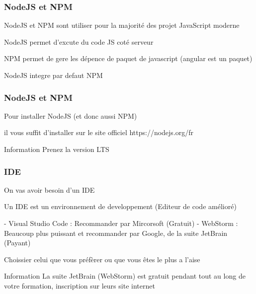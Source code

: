 \documentclass[10pt]{beamer}
\begin{document}
	\begin{frame}
		\frametitle{NodeJS et NPM}

		NodeJS et NPM sont utiliser pour la majorité des projet JavaScript moderne \newline \newline

		NodeJS permet d’excute du code JS coté serveur \newline \newline

		NPM permet de gere les dépence de paquet de javascript (angular est un paquet) \newline \newline

		NodeJS integre par defaut NPM

	\end{frame}

	\begin{frame}
		\frametitle{NodeJS et NPM}

		Pour installer NodeJS (et donc aussi NPM) \newline \newline

		il vous suffit d'installer sur le site officiel https://nodejs.org/fr \newline \newline

		\begin{block}{Information}
			Prenez la version LTS
		\end{block}

	\end{frame}

	\begin{frame}
		\frametitle{IDE}

		On vas avoir besoin d'un IDE \newline \newline

		Un IDE est un environnement de developpement (Editeur de code amélioré) \newline \newline

		- Visual Studio Code : Recommander par Mircorsoft (Gratuit) \newline
		- WebStorm : Beaucoup plus puissant et recommander par Google, de la suite JetBrain (Payant) \newline  \newline

		Choissier celui que vous préfèrer ou que vous êtes le plus a l'aise  \newline \newline

		\begin{block}{Information}
			La suite JetBrain (WebStorm) est gratuit pendant tout au long de votre formation, inscription sur leurs site internet
		\end{block}

	\end{frame}
\end{document}
